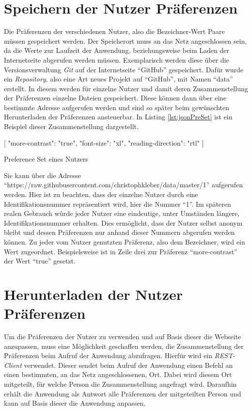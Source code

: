 \documentclass[12pt, paper=a4, bibtotoc, toc=listof, headsepline=true, numbers=endperiod]{scrreprt}
\begin{document}
\section{Speichern der Nutzer Präferenzen}
Die Präferenzen der verschiedenen Nutzer, also die Bezeichner-Wert Paare müssen gespeichert werden. Der Speicherort muss an das Netz angeschlossen sein, da die Werte zur Laufzeit der Anwendung, beziehungsweise beim Laden der Internetseite abgerufen werden müssen. Exemplarisch werden diese über die Versionsverwaltung \emph{Git} auf der Internetseite \enquote{GitHub} gespeichert. Dafür wurde ein \emph{Repository}, also eine Art neues Projekt auf \enquote{GitHub}, mit Namen \enquote{data} erstellt. In diesem werden für einzelne Nutzer und damit deren Zusammenstellung der Präferenzen einzelne  Dateien gespeichert. Diese können dann über eine bestimmte Adresse aufgerufen werden und sind so später beim gewünschten Herunterladen der Präferenzen ansteuerbar. In Listing \ref{lst:jsonPreSet} ist ein Beispiel dieser Zusammenstellung dargestellt.
\begin{listing}
	\begin{JavaScriptcode*}{}
[
	{
		"more-contrast": "true",
		"font-size": "xl",
		"reading-direction": "rtl"
	}
]
	\end{JavaScriptcode*}
	\caption[Beispiel eines Preference Sets]{Preference Set eines Nutzers}
	\label{lst:jsonPreSet}
\end{listing}\noindent
Sie kann über die Adresse 
\newline
\enquote{https://raw.githubusercontent.com/christophkleber/data/master/1} aufgerufen werden. Hier ist zu beachten, dass der einzelne Nutzer durch eine Identifikationsnummer repräsentiert wird, hier die Nummer \enquote{1}. Im späteren realen Gebrauch würde jeder Nutzer eine eindeutige, unter Umständen längere, Identifikationsnummer erhalten. Dies ermöglicht, dass der Nutzer selbst anonym bleibt und dessen Präferenzen nur anhand dieser Nummern abgerufen werden können. Zu jeder vom Nutzer genutzten Präferenz, also dem Bezeichner, wird ein Wert zugeordnet. Beispielsweise ist in Zeile drei zur Präferenz \enquote{more-contrast} der Wert \enquote{true} gesetzt. 
\section{Herunterladen der Nutzer Präferenzen}
\label{sec:herPre}
Um die Präferenzen der Nutzer zu verwenden und auf Basis dieser die Webseite anzupassen, muss eine Möglichkeit geschaffen werden, die Zusammenstellung der Präferenzen beim Aufruf der Anwendung abzufragen. Hierfür wird ein \emph{REST-Client} verwendet. Dieser sendet beim Aufruf der Anwendung einen Befehl an einen bestimmten, an das Netz angeschlossenen, Ort. Dabei wird diesem Ort mitgeteilt, für welche Person die Zusammenstellung angefragt wird. Daraufhin erhält die Anwendung als Antwort alle Präferenzen der mitgeteilten Person und kann auf Basis dieser die Anwendung anpassen.
\end{document}
